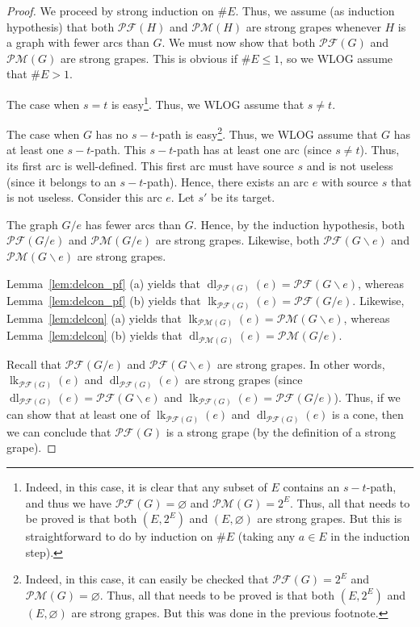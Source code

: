 \documentclass[10pt,a4paper]{amsart}
\DeclareMathOperator{\dl}{dl}
\DeclareMathOperator{\lk}{lk}
\newcommand{\Pf}[1]{\mathcal{PF}\left(#1\right)}
\newcommand{\Pm}[1]{\mathcal{PM}\left(#1\right)}
\newcommand{\tup}[1]{\left( #1 \right)}
\begin{document}
\begin{proof}
We proceed by strong induction on $\# E$.
Thus, we assume (as induction hypothesis) that both $\Pf{H}$ and $\Pm{H}$ are strong grapes whenever $H$ is a graph with fewer arcs than $G$.
We must now show that both $\Pf{G}$ and $\Pm{G}$ are strong grapes.
This is obvious if $\# E \leq 1$, so we WLOG assume that $\# E > 1$.

The case when $s = t$ is easy\footnote{%
Indeed, in this case, it is clear that any subset of $E$
contains an $s-t$-path, and thus we have
$\Pf{G} = \varnothing$ and $\Pm{G} = 2^E$.
Thus, all that needs to be proved is that both $\tup{E, 2^E}$
and $\tup{E, \varnothing}$ are strong grapes.
But this is straightforward to do by induction on $\# E$
(taking any $a \in E$ in the induction step).}.
Thus, we WLOG assume that $s \neq t$.

The case when $G$ has no $s-t$-path is easy\footnote{%
Indeed, in this case, it can easily be checked that
$\Pf{G} = 2^E$ and $\Pm{G} = \varnothing$.
Thus, all that needs to be proved is that both $\tup{E, 2^E}$
and $\tup{E, \varnothing}$ are strong grapes.
But this was done in the previous footnote.}.
Thus, we WLOG assume that $G$ has at least one $s-t$-path.
This $s-t$-path has at least one arc (since $s \neq t$).
Thus, its first arc is well-defined.
This first arc must have source $s$ and is not useless (since it
belongs to an $s-t$-path).
Hence, there exists an arc $e$ with source $s$ that is not useless.
Consider this arc $e$.
Let $s'$ be its target.

The graph $G / e$ has fewer arcs than $G$.
Hence, by the induction hypothesis, both
$\Pf{G / e}$ and $\Pm{G / e}$ are strong grapes.
Likewise, both
$\Pf{G \backslash e}$ and $\Pm{G \backslash e}$ are strong grapes.

Lemma~\ref{lem:delcon_pf} (a) yields
that $\dl_{\Pf{G}}(e) = \Pf{G \backslash e}$,
whereas
Lemma~\ref{lem:delcon_pf} (b) yields
that $\lk_{\Pf{G}}(e) = \Pf{G / e}$.
Likewise, Lemma~\ref{lem:delcon} (a) yields
that $\lk_{\Pm{G}}(e) = \Pm{G \backslash e}$,
whereas
Lemma~\ref{lem:delcon} (b) yields
that $\dl_{\Pm{G}}(e) = \Pm{G / e}$.

Recall that $\Pf{G / e}$ and $\Pf{G \backslash e}$ are
strong grapes.
In other words, $\lk_{\Pf{G}}(e)$ and $\dl_{\Pf{G}}(e)$
are strong grapes
(since $\dl_{\Pf{G}}(e) = \Pf{G \backslash e}$ and
$\lk_{\Pf{G}}(e) = \Pf{G / e}$).
Thus, if we can show that at least one of
$\lk_{\Pf{G}}(e)$ and $\dl_{\Pf{G}}(e)$ is a cone,
then we can conclude that $\Pf{G}$ is a strong grape
(by the definition of a strong grape).


\end{proof}
\end{document}
